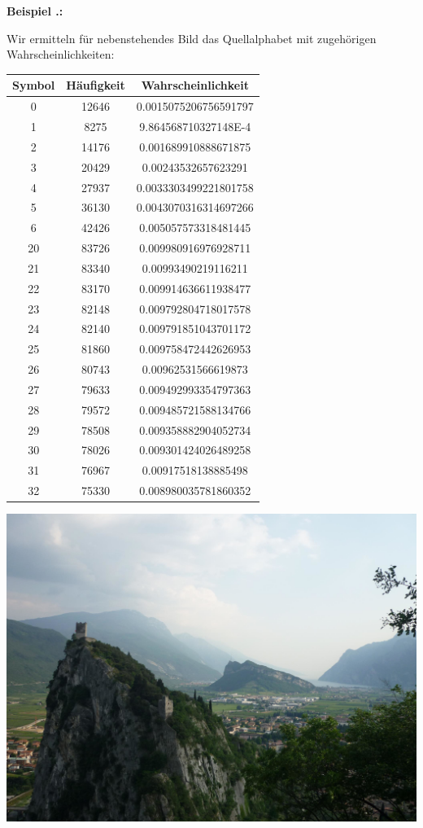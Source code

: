 \documentclass[a4paper,12pt]{article}
\newcounter{Beispiel}
\newenvironment{Beispiel}{
\medskip
        
        \setlength{\parindent}{0pt}
        \addtocounter{Beispiel}{1}
        \textbf{\textsf{Beispiel \thesubsection.\theBeispiel}:}\\}{
        \nopagebreak
        \vspace{-1.0ex}
        \bigskip
        
}
\begin{document}
\begin{Beispiel}
\begin{minipage}[h]{.5\textwidth}
Wir ermitteln für nebenstehendes Bild das Quellalphabet mit zugehörigen Wahrscheinlichkeiten:
\par
\vspace{0.5cm}
\begin{tabular}{c|c|c}
Symbol & Häufigkeit & Wahrscheinlichkeit
\\
\hline
0	& 12646 &	0.0015075206756591797\\ \hline
1&	8275&	9.864568710327148E-4\\ \hline
2&	14176&	0.001689910888671875\\ \hline
3&	20429&	0.00243532657623291	\\ \hline
4&	27937&	0.0033303499221801758\\ \hline
5&	36130&	0.0043070316314697266\\ \hline
6&	42426&	0.005057573318481445	\\ \hline
20&	83726&	0.009980916976928711	\\ \hline
21	&83340&	0.00993490219116211	\\ \hline
22&	83170	&0.009914636611938477	\\ \hline
23&	82148&	0.009792804718017578	\\ \hline
24&	82140&	0.009791851043701172\\ \hline
25&	81860&	0.009758472442626953\\ \hline
26&	80743&	0.00962531566619873	\\ \hline
27&	79633&	0.009492993354797363\\ \hline
28&	79572&	0.009485721588134766\\ \hline
29&	78508&	0.009358882904052734\\ \hline
30&	78026&	0.009301424026489258\\ \hline
31&	76967&	0.00917518138885498	\\ \hline
32&	75330&	0.008980035781860352
\end{tabular}
\vspace{0.5cm}
\end{minipage}
\hfill
\begin{minipage}[h]{.4\textwidth}
\begin{flushright}
\includegraphics[width=0.9\linewidth,height=0.5\textheight]{antechima}

\end{flushright}
\end{minipage}
\end{Beispiel}
\end{document}
